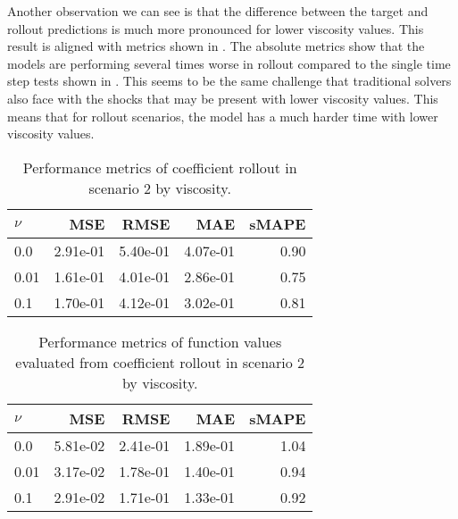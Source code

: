 Another observation we can see is that the difference between the target and rollout predictions is much more pronounced for lower viscosity values. This result is aligned with metrics shown in . The absolute metrics show that the models are performing several times worse in rollout compared to the single time step tests shown in . This seems to be the same challenge that traditional solvers also face with the shocks that may be present with lower viscosity values. This means that for rollout scenarios, the model has a much harder time with lower viscosity values.
\begin{table}[H]
  \caption{Performance metrics of coefficient rollout in scenario 2 by viscosity.}\label{table:scenario_2_rollout_spectral_metrics}
  \centering
  \begin{tabular}{lrrrr}
    \toprule
    \(\nu \) & MSE      & RMSE     & MAE      & sMAPE \\
    \midrule
    0.0      & 2.91e-01 & 5.40e-01 & 4.07e-01 & 0.90  \\
    0.01     & 1.61e-01 & 4.01e-01 & 2.86e-01 & 0.75  \\
    0.1      & 1.70e-01 & 4.12e-01 & 3.02e-01 & 0.81  \\
    \bottomrule
  \end{tabular}
\end{table}
\begin{table}[H]
  \caption{Performance metrics of function values evaluated from coefficient rollout in scenario 2 by viscosity.}\label{table:scenario_2_rollout_function_metrics}
  \centering
  \begin{tabular}{lrrrr}
    \toprule
    \(\nu \) & MSE      & RMSE     & MAE      & sMAPE \\
    \midrule
    0.0      & 5.81e-02 & 2.41e-01 & 1.89e-01 & 1.04  \\
    0.01     & 3.17e-02 & 1.78e-01 & 1.40e-01 & 0.94  \\
    0.1      & 2.91e-02 & 1.71e-01 & 1.33e-01 & 0.92  \\
    \bottomrule
  \end{tabular}
\end{table}

